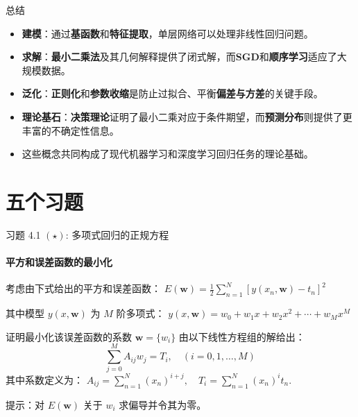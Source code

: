\documentclass[12pt, aspectratio=169]{beamer}
\begin{document}
\begin{frame}{总结}
    \begin{itemize}
        \item \textbf{建模}：通过\textbf{基函数}和\textbf{特征提取}，单层网络可以处理非线性回归问题。
        \item \textbf{求解}：\textbf{最小二乘法}及其几何解释提供了闭式解，而\textbf{SGD}和\textbf{顺序学习}适应了大规模数据。
        \item \textbf{泛化}：\textbf{正则化}和\textbf{参数收缩}是防止过拟合、平衡\textbf{偏差与方差}的关键手段。
        \item \textbf{理论基石}：\textbf{决策理论}证明了最小二乘对应于条件期望，而\textbf{预测分布}则提供了更丰富的不确定性信息。
        \item 这些概念共同构成了现代机器学习和深度学习回归任务的理论基础。
    \end{itemize}
\end{frame}


\section{五个习题}
\begin{frame}{习题 4.1 $(\star)$: 多项式回归的正规方程}
    \framesubtitle{平方和误差函数的最小化}
    考虑由下式给出的平方和误差函数：
    $\displaystyle
    E(\mathbf{w}) = \frac{1}{2} \sum_{n=1}^{N} \left[ y(x_n,\mathbf{w})-t_n \right]^2
    $

    其中模型 $y(x, \mathbf{w})$ 为 $M$ 阶多项式：
    $\displaystyle y(x, \mathbf{w}) = w_0 + w_1x + w_2x^2 + \cdots + w_Mx^M 
    $

    \vspace{0.5em}
    证明最小化该误差函数的系数 $\mathbf{w} = \{w_i\}$ 由以下线性方程组的解给出：
    \begin{equation}
        \sum_{j=0}^{M} A_{ij} w_j = T_i, \quad (i=0,1,\dots,M)
    \end{equation}
    其中系数定义为：
    $\displaystyle
        A_{ij} = \sum_{n=1}^{N} (x_n)^{i+j}, \quad 
        T_i = \sum_{n=1}^{N} (x_n)^i t_n.
    $
    
    \vspace{0.5em}
    \footnotesize{提示：对 $E(\mathbf{w})$ 关于 $w_i$ 求偏导并令其为零。}
\end{frame}
\end{document}
